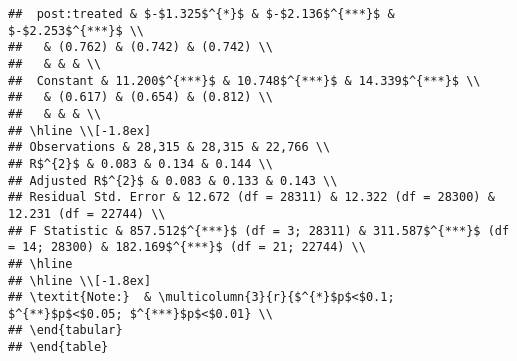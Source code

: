 \documentclass[11pt,]{article}
\begin{document}
\begin{verbatim}
##  post:treated & $-$1.325$^{*}$ & $-$2.136$^{***}$ & $-$2.253$^{***}$ \\ 
##   & (0.762) & (0.742) & (0.742) \\ 
##   & & & \\ 
##  Constant & 11.200$^{***}$ & 10.748$^{***}$ & 14.339$^{***}$ \\ 
##   & (0.617) & (0.654) & (0.812) \\ 
##   & & & \\ 
## \hline \\[-1.8ex] 
## Observations & 28,315 & 28,315 & 22,766 \\ 
## R$^{2}$ & 0.083 & 0.134 & 0.144 \\ 
## Adjusted R$^{2}$ & 0.083 & 0.133 & 0.143 \\ 
## Residual Std. Error & 12.672 (df = 28311) & 12.322 (df = 28300) & 12.231 (df = 22744) \\ 
## F Statistic & 857.512$^{***}$ (df = 3; 28311) & 311.587$^{***}$ (df = 14; 28300) & 182.169$^{***}$ (df = 21; 22744) \\ 
## \hline 
## \hline \\[-1.8ex] 
## \textit{Note:}  & \multicolumn{3}{r}{$^{*}$p$<$0.1; $^{**}$p$<$0.05; $^{***}$p$<$0.01} \\ 
## \end{tabular} 
## \end{table}
\end{verbatim}
\end{document}
